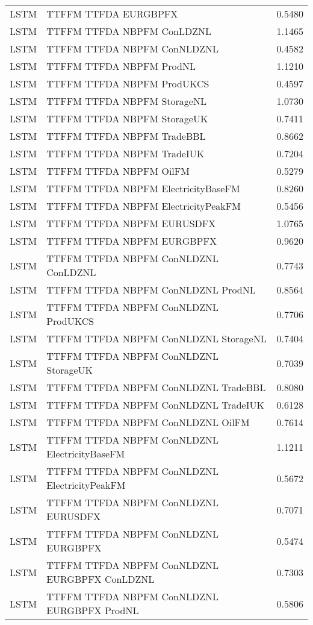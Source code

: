 \begin{table}[h!]
\begin{adjustbox}{max width=\textwidth}
\begin{tabular}{llr}
  LSTM & TTFFM TTFDA EURGBPFX & 0.5480 \\ 
  LSTM & TTFFM TTFDA NBPFM ConLDZNL & 1.1465 \\ 
  LSTM & TTFFM TTFDA NBPFM ConNLDZNL & 0.4582 \\ 
  LSTM & TTFFM TTFDA NBPFM ProdNL & 1.1210 \\ 
  LSTM & TTFFM TTFDA NBPFM ProdUKCS & 0.4597 \\ 
  LSTM & TTFFM TTFDA NBPFM StorageNL & 1.0730 \\ 
  LSTM & TTFFM TTFDA NBPFM StorageUK & 0.7411 \\ 
  LSTM & TTFFM TTFDA NBPFM TradeBBL & 0.8662 \\ 
  LSTM & TTFFM TTFDA NBPFM TradeIUK & 0.7204 \\ 
  LSTM & TTFFM TTFDA NBPFM OilFM & 0.5279 \\ 
  LSTM & TTFFM TTFDA NBPFM ElectricityBaseFM & 0.8260 \\ 
  LSTM & TTFFM TTFDA NBPFM ElectricityPeakFM & 0.5456 \\ 
  LSTM & TTFFM TTFDA NBPFM EURUSDFX & 1.0765 \\ 
  LSTM & TTFFM TTFDA NBPFM EURGBPFX & 0.9620 \\ 
  LSTM & TTFFM TTFDA NBPFM ConNLDZNL ConLDZNL & 0.7743 \\ 
  LSTM & TTFFM TTFDA NBPFM ConNLDZNL ProdNL & 0.8564 \\ 
  LSTM & TTFFM TTFDA NBPFM ConNLDZNL ProdUKCS & 0.7706 \\ 
  LSTM & TTFFM TTFDA NBPFM ConNLDZNL StorageNL & 0.7404 \\ 
  LSTM & TTFFM TTFDA NBPFM ConNLDZNL StorageUK & 0.7039 \\ 
  LSTM & TTFFM TTFDA NBPFM ConNLDZNL TradeBBL & 0.8080 \\ 
  LSTM & TTFFM TTFDA NBPFM ConNLDZNL TradeIUK & 0.6128 \\ 
  LSTM & TTFFM TTFDA NBPFM ConNLDZNL OilFM & 0.7614 \\ 
  LSTM & TTFFM TTFDA NBPFM ConNLDZNL ElectricityBaseFM & 1.1211 \\ 
  LSTM & TTFFM TTFDA NBPFM ConNLDZNL ElectricityPeakFM & 0.5672 \\ 
  LSTM & TTFFM TTFDA NBPFM ConNLDZNL EURUSDFX & 0.7071 \\ 
  LSTM & TTFFM TTFDA NBPFM ConNLDZNL EURGBPFX & 0.5474 \\ 
  LSTM & TTFFM TTFDA NBPFM ConNLDZNL EURGBPFX ConLDZNL & 0.7303 \\ 
  LSTM & TTFFM TTFDA NBPFM ConNLDZNL EURGBPFX ProdNL & 0.5806 \\ 

\end{tabular}
\end{adjustbox}
\end{table}
